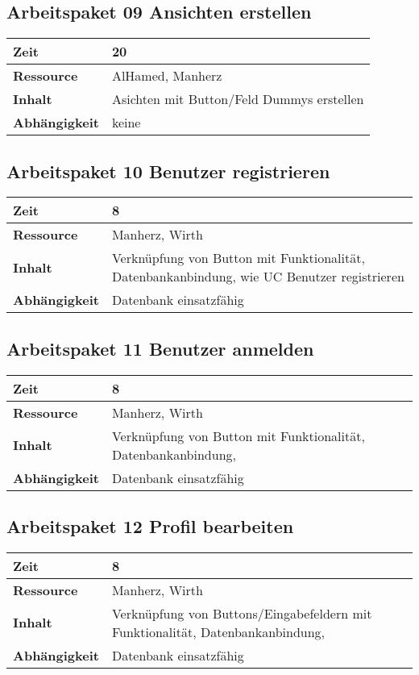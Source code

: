 \documentclass[12pt,a4paper,onecolumn]{article}
\begin{document}
\subsection{Arbeitspaket 09 Ansichten erstellen}
\begin{tabularx}{\textwidth}{|l|X|}
\hline
     \textbf{Zeit} & 20 \\
     \hline
     \textbf{Ressource} & AlHamed, Manherz\\
     \hline
     \textbf{Inhalt} & Asichten mit Button/Feld Dummys erstellen\\
     \hline
     \textbf{Abhängigkeit} & keine\\
\hline
\end{tabularx}
\subsection{Arbeitspaket 10 Benutzer registrieren}
\begin{tabularx}{\textwidth}{|l|X|}
\hline
     \textbf{Zeit} & 8 \\
     \hline
     \textbf{Ressource} & Manherz, Wirth\\
     \hline
     \textbf{Inhalt} & Verknüpfung von Button mit Funktionalität, Datenbankanbindung, wie UC Benutzer registrieren\\
     \hline
     \textbf{Abhängigkeit} & Datenbank einsatzfähig\\
\hline
\end{tabularx}
\subsection{Arbeitspaket 11 Benutzer anmelden}
\begin{tabularx}{\textwidth}{|l|X|}
\hline
     \textbf{Zeit} & 8\\
     \hline
     \textbf{Ressource} & Manherz, Wirth\\
     \hline
     \textbf{Inhalt} &  Verknüpfung von Button mit Funktionalität, Datenbankanbindung,\\
     \hline
     \textbf{Abhängigkeit} & Datenbank einsatzfähig\\
\hline
\end{tabularx}
\subsection{Arbeitspaket 12 Profil bearbeiten}
\begin{tabularx}{\textwidth}{|l|X|}
\hline
     \textbf{Zeit} & 8\\
     \hline
     \textbf{Ressource} & Manherz, Wirth\\
     \hline
     \textbf{Inhalt} &  Verknüpfung von Buttons/Eingabefeldern mit Funktionalität, Datenbankanbindung,\\
     \hline
     \textbf{Abhängigkeit} & Datenbank einsatzfähig\\
\hline
\end{tabularx}
\end{document}
